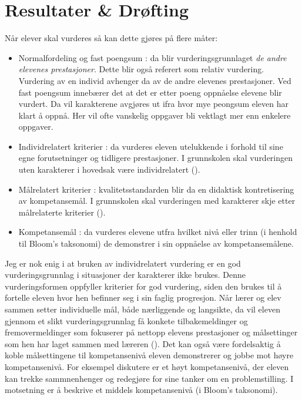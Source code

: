 \documentclass[main.tex]{subfiles}
\begin{document}
\section*{Resultater \& Drøfting}
\label{sec:4}

Når elever skal vurderes så kan dette gjøres på flere måter:
\begin{itemize}
\item Normalfordeling og fast poengsum : da blir vurderingsgrunnlaget \emph{de andre elevenes prestasjoner}. 
Dette blir også referert som relativ vurdering. Vurdering av en individ avhenger da av de andre
elevenes prestasjoner. Ved fast poengsum innebærer det at det er etter poeng oppnåelse elevene blir vurdert. 
Da vil karakterene avgjøres ut ifra hvor mye peongsum eleven har klart å oppnå. Her vil ofte vanskelig oppgaver
bli vektlagt mer enn enkelere oppgaver.
\item Individrelatert kriterier : da vurderes eleven utelukkende i forhold til sine egne forutsetninger
og tidligere prestasjoner. I grunnskolen skal vurderingen uten karakterer i hovedsak være 
individrelatert  ().
\item Målrelatert kriterier : kvalitetsstandarden blir da en didaktisk kontretisering av kompetansemål.
 I grunnskolen skal vurderingen med karakterer skje etter målrelaterte kriterier ().
\item Kompetansemål : da vurderes elevene utfra hvilket nivå eller trinn (i henhold til Bloom's taksonomi) 
                      de demonstrer i sin oppnåelse av kompetansemålene.
\end{itemize}
Jeg er nok enig i at bruken av individrelatert vurdering er en god vurderingsgrunnlag i situasjoner
der karakterer ikke brukes. Denne vurderingsformen oppfyller kriterier for god vurdering, siden den brukes til å 
fortelle eleven hvor hen befinner seg i sin faglig progresjon. Når lærer og elev sammen setter individuelle mål, både 
nærliggende og langsikte, da vil eleven gjennom et slikt vurderingsgrunnlag få konkete tilbakemeldinger og 
fremovermeldinger som fokuserer på nettopp elevens prestasjoner og målsettinger som hen har laget sammen med
læreren (). Det kan også være fordelsaktig å koble målsettingene til kompetansenivå eleven 
demonstrerer og jobbe mot høyre kompetansenivå. For eksempel diskutere er et høyt kompetansenivå, der eleven 
kan trekke sammnenhenger og redegjøre for sine tanker om en problemstilling. I motsetning er å beskrive et middels 
kompetansenivå (i Bloom's taksonomi).
\end{document}

